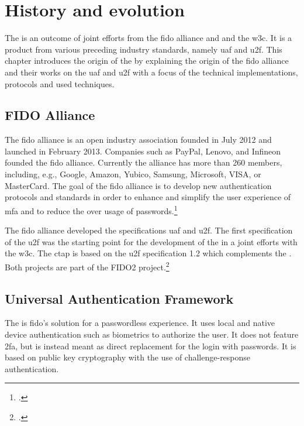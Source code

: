 
\section{History and evolution}

The \wa{} is an outcome of joint efforts from the \gls{fido} alliance and and the \gls{w3c}. It is a product from various preceding industry standards, namely \gls{uaf} and \gls{u2f}. This chapter introduces the origin of the \wa{} by explaining the origin of the \gls{fido} alliance and their works on the \gls{uaf} and \gls{u2f} with a focus of the technical implementations, protocols and used techniques.

\subsection{FIDO Alliance}

The \gls{fido} alliance is an open industry association founded in July 2012 and launched in February 2013. Companies such as PayPal, Lenovo, and Infineon founded the \gls{fido} alliance. Currently the alliance has more than 260 members, including, e.g., Google, Amazon, Yubico, Samsung, Microsoft, VISA, or MasterCard. The goal of the \gls{fido} alliance is to develop new authentication protocols and standards in order to enhance and simplify the user experience of \gls{mfa} and to reduce the over usage of passwords.\footcites[See][583]{eckert-it-sec-9}

The \gls{fido} alliance developed the specifications \gls{uaf} and \gls{u2f}. The first specification of the \gls{u2f} was the starting point for the development of the \wa{} in a joint efforts with the \gls{w3c}. The \gls{ctap} is based on the \gls{u2f} specification 1.2 which complements the \wa. Both projects are part of the FIDO2 project.\footcite[See][169--170]{grimes2017hacking}

\subsection{Universal Authentication Framework}

The  is \gls{fido}'s solution for a passwordless experience. It uses local and native device authentication such as biometrics to authorize the user. It does not feature \gls{2fa}, but is instead meant as direct replacement for the login with passwords. It is based on public key cryptography with the use of challenge-response authentication.

